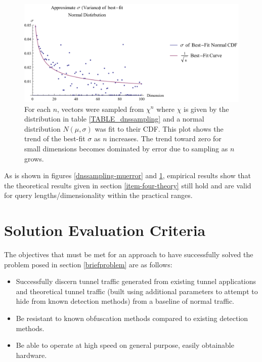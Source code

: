 \documentclass[12pt]{report}
\theoremstyle{remark}
\theoremstyle{definition}
\theoremstyle{definition}
\theoremstyle{definition}
\begin{document}
\begin{figure}
\centering
\includegraphics[width=\textwidth]{figures/dnssampling-sigmafit.pdf}
\caption[Trend of $\sigma$ of Best-Fit Normal Distribution of Sampled Expected Value]
{For each $n$, vectors were sampled from $\chi^n$ where $\chi$ is given by the
distribution in table \ref{TABLE_dnssampling} and a normal distribution
$N(\mu,\sigma)$ was fit to their CDF. This plot shows the trend of the best-fit
$\sigma$ as $n$ increases. The trend toward zero for small dimensions becomes
dominated by error due to sampling as $n$ grows.}
\label{dnssampling-sigmafit}
\end{figure}

As is shown in figures \ref{dnssampling-muerror} and \ref{dnssampling-sigmafit}, empirical results show that the theoretical results given in section
\ref{item-four-theory} still hold and are valid for query lengths/dimensionality
within the practical ranges.

\clearpage
\section{Solution Evaluation Criteria}

The objectives that must be met for an
approach to have successfully solved the problem posed in section
\ref{briefproblem} are as follows:

\label{methodreqs}
\begin{itemize}
\item Successfully discern tunnel traffic generated from
existing tunnel applications and theoretical tunnel traffic (built using
additional parameters to attempt to hide from known detection methods) from a
baseline of normal traffic.
\item Be resistant to known obfuscation methods compared to existing detection methods.
\item Be able to operate at high speed on general purpose, easily obtainable
hardware.
\end{itemize}
\end{document}
